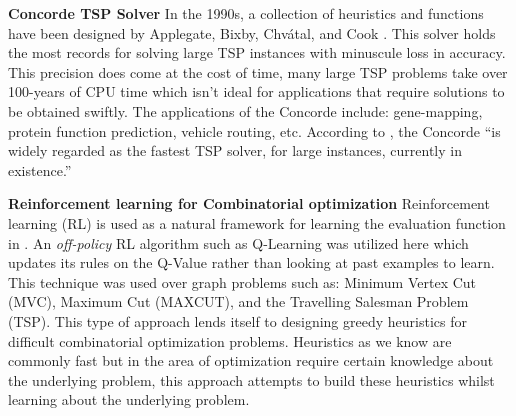 \documentclass[]{UCD_CS_FYP_Report}
\begin{document}
\textbf{Concorde TSP Solver}
In the 1990s, a collection of heuristics and functions have been designed by Applegate, Bixby, Chvátal, and Cook \cite{davidapplegate2007}. This solver holds the most records for solving large TSP instances with minuscule loss in accuracy. This precision does come at the cost of time, many large TSP problems take over 100-years of CPU time which isn't ideal for applications that require solutions to be obtained swiftly. The applications of the Concorde include: gene-mapping\cite{10.1093/jhered/esg012}, protein function prediction\cite{Johnson2006}, vehicle routing\cite{ApplegateVPR}, etc. According to \cite{MULDER2003827}, the Concorde “is widely regarded as the fastest TSP solver, for large instances, currently in existence.”

\textbf{Reinforcement learning for Combinatorial optimization}
Reinforcement learning (RL) is used as a natural framework for learning the evaluation function in \cite{DBLP:journals/corr/DaiKZDS17}. An \textit{off-policy} RL algorithm such as Q-Learning was utilized here which updates its rules on the Q-Value rather than looking at past examples to learn. This technique was used over graph problems such as: Minimum Vertex Cut (MVC), Maximum Cut (MAXCUT), and the Travelling Salesman Problem (TSP). This type of approach lends itself to designing greedy heuristics for difficult combinatorial optimization problems. Heuristics as we know are commonly fast but in the area of optimization require certain knowledge about the underlying problem, this approach attempts to build these heuristics whilst learning about the underlying problem.
\end{document}
